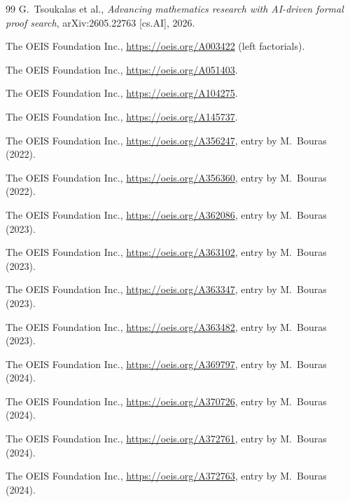 \documentclass[11pt]{amsart}
\theoremstyle{plain}
\theoremstyle{definition}
\begin{document}
\begin{thebibliography}{99}
G.~Tsoukalas et al., \emph{Advancing mathematics research with AI-driven formal proof search}, arXiv:2605.22763 [cs.AI], 2026.

The OEIS Foundation Inc., \url{https://oeis.org/A003422} (left factorials).

The OEIS Foundation Inc., \url{https://oeis.org/A051403}.

The OEIS Foundation Inc., \url{https://oeis.org/A104275}.

The OEIS Foundation Inc., \url{https://oeis.org/A145737}.

The OEIS Foundation Inc., \url{https://oeis.org/A356247}, entry by M.~Bouras (2022).

The OEIS Foundation Inc., \url{https://oeis.org/A356360}, entry by M.~Bouras (2022).

The OEIS Foundation Inc., \url{https://oeis.org/A362086}, entry by M.~Bouras (2023).

The OEIS Foundation Inc., \url{https://oeis.org/A363102}, entry by M.~Bouras (2023).

The OEIS Foundation Inc., \url{https://oeis.org/A363347}, entry by M.~Bouras (2023).

The OEIS Foundation Inc., \url{https://oeis.org/A363482}, entry by M.~Bouras (2023).

The OEIS Foundation Inc., \url{https://oeis.org/A369797}, entry by M.~Bouras (2024).

The OEIS Foundation Inc., \url{https://oeis.org/A370726}, entry by M.~Bouras (2024).

The OEIS Foundation Inc., \url{https://oeis.org/A372761}, entry by M.~Bouras (2024).

The OEIS Foundation Inc., \url{https://oeis.org/A372763}, entry by M.~Bouras (2024).

\end{thebibliography}
\end{document}
